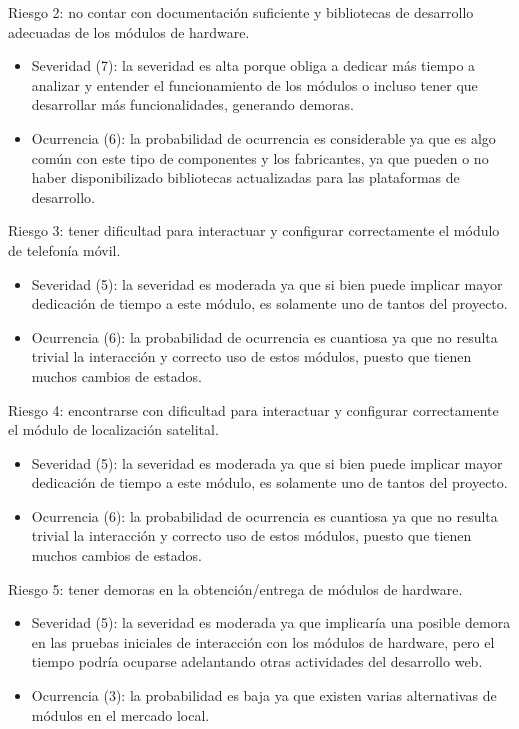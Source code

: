 \documentclass[
11pt, %
]{charter}
\begin{document}
Riesgo 2: no contar con documentación suficiente y bibliotecas de desarrollo adecuadas de los módulos de hardware.
\begin{itemize}
	\item Severidad (7):  la severidad es alta porque obliga a dedicar más tiempo a analizar y entender el funcionamiento de los módulos o incluso tener que desarrollar más funcionalidades, generando demoras.
	\item Ocurrencia (6): la probabilidad de ocurrencia es considerable ya que es algo común con este tipo de componentes y los fabricantes, ya que pueden o no haber disponibilizado bibliotecas actualizadas para las plataformas de desarrollo.
\end{itemize}

Riesgo 3: tener dificultad para interactuar y configurar correctamente el módulo de telefonía móvil.
\begin{itemize}
	\item Severidad (5): la severidad es moderada ya que si bien puede implicar mayor dedicación de tiempo a este módulo, es solamente uno de tantos del proyecto.
	\item Ocurrencia (6): la probabilidad de ocurrencia es cuantiosa ya que no resulta trivial la interacción y correcto uso de estos módulos, puesto que tienen muchos cambios de estados.
\end{itemize}

Riesgo 4: encontrarse con dificultad para interactuar y configurar correctamente el módulo de localización satelital.
\begin{itemize}
	\item Severidad (5): la severidad es moderada ya que si bien puede implicar mayor dedicación de tiempo a este módulo, es solamente uno de tantos del proyecto.
	\item Ocurrencia (6): la probabilidad de ocurrencia es cuantiosa ya que no resulta trivial la interacción y correcto uso de estos módulos, puesto que tienen muchos cambios de estados.
\end{itemize}

Riesgo 5: tener demoras en la obtención/entrega de módulos de hardware.
\begin{itemize}
	\item Severidad (5): la severidad es moderada ya que implicaría una posible demora en las pruebas iniciales de interacción con los módulos de hardware, pero el tiempo podría ocuparse adelantando otras actividades del desarrollo web.
	\item Ocurrencia (3): la probabilidad es baja ya que existen varias alternativas de módulos en el mercado local.
\end{itemize}
\end{document}
